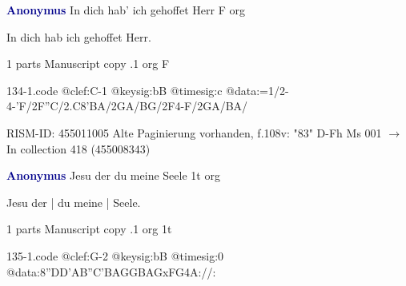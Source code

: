 \documentclass[twocolumn]{book}
\begin{document}
\newline \par \vspace{7pt} \textcolor{darkblue}{\textbf{Anonymus  }}
\newline In dich hab' ich gehoffet Herr  F  
\newline org
\newline \begin{itshape}[f.108v, heading:] In dich hab ich gehoffet Herr.\end{itshape} 
\newline \textcolor{darkblue}{}  1 parts  
\newline Manuscript copy
.1  org  F  
\begin{filecontents*}{134-1.code}
@clef:C-1
@keysig:bB
@timesig:c
@data:=1/2-4-'F/2F''C/2.C{8'BA}/2GA/BG/2F4-F/2GA/BA/
\end{filecontents*}
\newline
%

\newline RISM-ID: 455011005
\newline Alte Paginierung vorhanden, f.108v: "83"
\newline D-Fh  Ms 001
\newline $\rightarrow$ In collection 418 (455008343)

\newline \par \vspace{7pt} \textcolor{darkblue}{\textbf{Anonymus  }}
\newline Jesu der du meine Seele  1t  
\newline org
\newline \begin{itshape}[f.53v, at left:] Jesu der | du meine | Seele.\end{itshape} 
\newline \textcolor{darkblue}{}  1 parts  
\newline Manuscript copy
.1  org  1t  
\begin{filecontents*}{135-1.code}
@clef:G-2
@keysig:bB
@timesig:0
@data:{8''DD'AB}{''C'BAG}{GBAG}{xFG}4A://:
\end{filecontents*}
\newline
%
\end{document}

